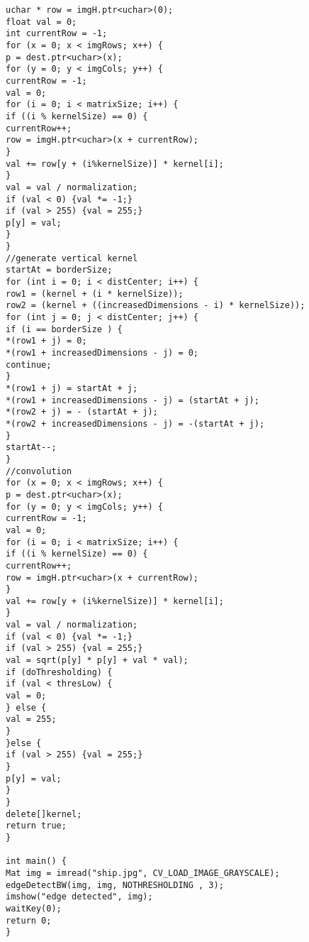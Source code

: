 \documentclass{article}
\begin{document}
\begin{lstlisting}
uchar * row = imgH.ptr<uchar>(0);
float val = 0;
int currentRow = -1;
for (x = 0; x < imgRows; x++) {
p = dest.ptr<uchar>(x);
for (y = 0; y < imgCols; y++) {
currentRow = -1;
val = 0;
for (i = 0; i < matrixSize; i++) {
if ((i % kernelSize) == 0) {
currentRow++;
row = imgH.ptr<uchar>(x + currentRow);
}
val += row[y + (i%kernelSize)] * kernel[i];
}
val = val / normalization;
if (val < 0) {val *= -1;}
if (val > 255) {val = 255;}
p[y] = val;
}
}
//generate vertical kernel
startAt = borderSize;
for (int i = 0; i < distCenter; i++) {
row1 = (kernel + (i * kernelSize));
row2 = (kernel + ((increasedDimensions - i) * kernelSize));
for (int j = 0; j < distCenter; j++) {
if (i == borderSize ) {
*(row1 + j) = 0;
*(row1 + increasedDimensions - j) = 0;
continue;
}
*(row1 + j) = startAt + j;
*(row1 + increasedDimensions - j) = (startAt + j);
*(row2 + j) = - (startAt + j);
*(row2 + increasedDimensions - j) = -(startAt + j);
}
startAt--;
}
//convolution 
for (x = 0; x < imgRows; x++) {
p = dest.ptr<uchar>(x);
for (y = 0; y < imgCols; y++) {
currentRow = -1;
val = 0;
for (i = 0; i < matrixSize; i++) {
if ((i % kernelSize) == 0) {
currentRow++;
row = imgH.ptr<uchar>(x + currentRow);
}
val += row[y + (i%kernelSize)] * kernel[i];
}
val = val / normalization;
if (val < 0) {val *= -1;}
if (val > 255) {val = 255;}
val = sqrt(p[y] * p[y] + val * val);
if (doThresholding) {
if (val < thresLow) {
val = 0;
} else {
val = 255;
}
}else {
if (val > 255) {val = 255;}
}
p[y] = val;
}
}
delete[]kernel;
return true;
}

int main() {
Mat img = imread("ship.jpg", CV_LOAD_IMAGE_GRAYSCALE);
edgeDetectBW(img, img, NOTHRESHOLDING , 3);
imshow("edge detected", img);
waitKey(0);
return 0;
}

\end{lstlisting}
\end{document}
